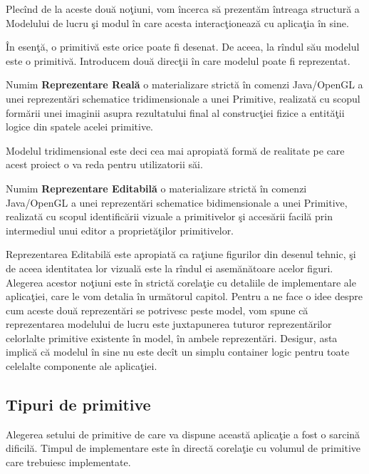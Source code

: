 Plecînd de la aceste două noţiuni, vom încerca să prezentăm întreaga structură 
a Modelului de lucru şi modul în care acesta interacţionează cu aplicaţia în 
sine.

În esenţă, o primitivă este orice poate fi desenat. De aceea, la rîndul său 
modelul este o primitivă. Introducem două direcţii în care modelul poate fi 
reprezentat.

\begin{definition}
\label{define:realRender}
Numim \textbf{Reprezentare Reală} o materializare strictă în comenzi 
Java/OpenGL a unei reprezentări schematice tridimensionale a unei Primitive, 
realizată cu scopul formării unei imaginii asupra rezultatului final al 
construcţiei fizice a entităţii logice din spatele acelei primitive. 
\end{definition} Modelul tridimensional este deci cea mai apropiată formă de 
realitate pe care acest proiect o va reda pentru utilizatorii săi.

\begin{definition}
\label{define:editorRender}
Numim \textbf{Reprezentare Editabilă} o materializare strictă în comenzi 
Java/OpenGL a unei reprezentări schematice bidimensionale a unei Primitive, 
realizată cu scopul identificării vizuale a primitivelor şi accesării facilă 
prin intermediul unui editor a proprietăţilor primitivelor.
\end{definition}

Reprezentarea Editabilă este apropiată ca raţiune figurilor din desenul tehnic, 
şi de aceea identitatea lor vizuală este la rîndul ei asemănătoare acelor 
figuri. Alegerea acestor noţiuni este în strictă corelaţie cu detaliile de 
implementare ale aplicaţiei, care le vom detalia în următorul capitol. Pentru a 
ne face o idee despre cum aceste două reprezentări se potrivesc peste model, 
vom spune că reprezentarea modelului de lucru este juxtapunerea tuturor 
reprezentărilor celorlalte primitive existente în model, în ambele 
reprezentări. Desigur, asta implică că modelul în sine nu este decît un simplu 
container logic pentru toate celelalte componente ale aplicaţiei.

\subsection{Tipuri de primitive}
\label{section:primitives}
Alegerea setului de primitive de care va dispune această aplicaţie a fost o 
sarcină dificilă. Timpul de implementare este în directă corelaţie cu volumul 
de primitive care trebuiesc implementate.

